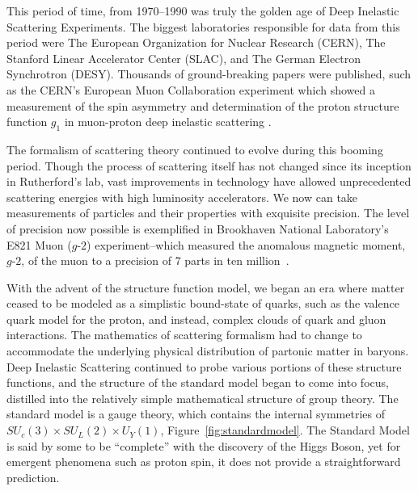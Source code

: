 This period of time, from 1970--1990 was truly the golden age of Deep Inelastic
Scattering Experiments. The biggest laboratories responsible for data from this
period were The European Organization for Nuclear Research (CERN), The Stanford
Linear Accelerator Center (SLAC), and The German Electron Synchrotron (DESY).
Thousands of ground-breaking papers were published, such as the CERN's European
Muon Collaboration experiment which showed a measurement of the spin asymmetry
and determination of the proton structure function $g_1$ in muon-proton deep
inelastic scattering \cite{Ashman1988}. 

The formalism of scattering theory continued to evolve during this booming
period.  Though the process of scattering itself has not changed since its
inception in Rutherford's lab, vast improvements in technology have allowed
unprecedented scattering energies with high luminosity accelerators. We now can
take measurements of particles and their properties with exquisite precision.
The level of precision now possible is exemplified in Brookhaven National
Laboratory's E821 Muon ($g$-$2$) experiment--which measured the anomalous
magnetic moment, $g$-$2$, of the muon to a precision of 7 parts in ten
million~\cite{Bennett}.

\clearpage

With the advent of the structure function model, we began an era where matter
ceased to be modeled as a simplistic bound-state of quarks, such as the valence
quark model for the proton, and instead, complex clouds of quark and gluon
interactions. The mathematics of scattering formalism had to change to
accommodate the underlying physical distribution of partonic matter in baryons.
Deep Inelastic Scattering continued to probe various portions of these structure
functions, and the structure of the standard model began to come into focus,
distilled into the relatively simple mathematical structure of group theory. The
standard model is a gauge theory, which contains the internal symmetries of
$SU_{c}(3) \times SU_{L}(2) \times U_{Y}(1)$, Figure~\ref{fig:standardmodel}.
The Standard Model is said by some to be ``complete'' with the discovery of the
Higgs Boson, yet for emergent phenomena such as proton spin, it does not provide
a straightforward prediction. 

